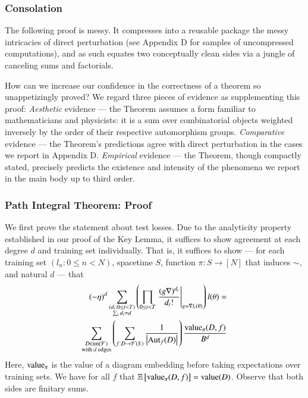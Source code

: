 \documentclass{article}
\newcommand{\Free}{\mathcal{F}}
\newcommand{\Aut}{\text{\textnormal{Aut}}}
\newcommand{\image}{\text{\textnormal{im}}}
\newcommand{\dvalue}{\text{\textnormal{value}}}
\newcommand{\expct}[1]{\mathbb{E}\left[#1\right]}
\newcommand{\wrap}[1]{\left(#1\right)}
\newcommand{\wabs}[1]{\left|#1\right|}
\begin{document}
        \subsubsection*{Consolation}
            The following proof is messy.  It compresses into a reusable
            package the messy intricacies of direct perturbation (see
            Appendix D for samples of uncompressed computations), and as such 
            equates two conceptually clean sides via a jungle of canceling
            sums and factorials.  

            How can we increase our confidence in the correctness of a theorem
            so unappetizingly proved?  We regard three pieces of evidence as
            supplementing this proof: \emph{Aesthetic} evidence --- the Theorem
            assumes a form familiar to mathematicians and physicists: it is a
            sum over combinatorial objects weighted inversely by the order of
            their respective automorphism groups.  \emph{Comparative}
            evidence --- the Theorem's predictions agree with direct
            perturbation in the cases we report in Appendix D.
            \emph{Empirical} evidence --- the Theorem, though compactly stated,
            precisely predicts the existence and intensity of the phenomena we
            report in the main body up to third order.
 
        \subsubsection*{Path Integral Theorem: Proof}
            We first prove the statement about test losses.
            Due to the analyticity property established in our proof of the
            Key Lemma, it suffices to show agreement at each degree $d$ and
            training set individually.  That is, it suffices to show --- for
            each training set $(l_n: 0\leq n<N)$, spacetime $S$, function $\pi:
            S\to [N]$ that induces $\sim$, and natural $d$ --- that
            \begin{align} \label{eq:toprove}
                (-\eta)^d
                \sum_{\substack{
                    (d_t: 0\leq t<T) \\
                    \sum_t d_t = d
                }}
                \wrap{
                    \prod_{0 \leq t < T} \left.
                        \frac{(g \nabla)^{d_t}}{d_t!}
                    \right|_{g=\nabla l_t(\theta)}
                } l (\theta)
                = \nonumber \\
                \sum_{\substack{
                    D \in \image(\Free) \\
                    \textnormal{with $d$ edges}
                }}
                \wrap{
                    \sum_{f: D\to\Free(S)}
                    \frac{1}{\wabs{\Aut_f(D)}}
                }
                \frac{\dvalue_\pi(D, f)}{B^{d}}
            \end{align}
            Here, $\dvalue_\pi$ is the value of a diagram embedding before
            taking expectations over training sets.  We have for all $f$ that
            $\expct{\dvalue_\pi(D, f)} = \dvalue(D)$.
            Observe that both sides are finitary sums.
\end{document}
